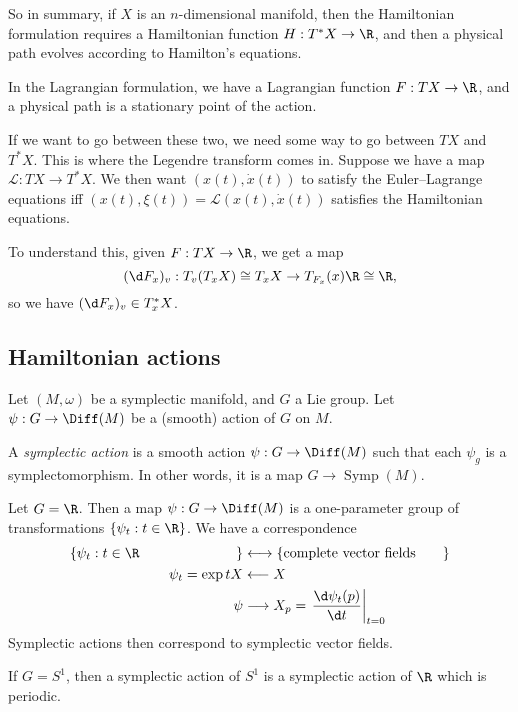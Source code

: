 \documentclass[a4paper]{article}
\DeclareMathOperator{\Symp}{Symp}
\begin{document}
So in summary, if $X$ is an $n$-dimensional manifold, then the Hamiltonian formulation requires a Hamiltonian function $H: T^* X \to \R$, and then a physical path evolves according to Hamilton's equations.

In the Lagrangian formulation, we have a Lagrangian function $F: TX \to \R$, and a physical path is a stationary point of the action.

If we want to go between these two, we need some way to go between $TX$ and $T^*X$. This is where the Legendre transform comes in. Suppose we have a map $\mathcal{L}: TX \to T^*X$. We then want $(x(t), \dot{x}(t))$ to satisfy the Euler--Lagrange equations iff $(x(t), \xi(t)) = \mathcal{L}(x(t), \dot{x}(t))$ satisfies the Hamiltonian equations.

To understand this, given $F: TX \to \R$, we get a map
\[
  (\d F_x)_v : T_v(T_x X) \cong T_x X \to T_{F_x}(x) \R \cong \R,
\]
so we have $(\d F_x)_v \in T_x^*X$.

\subsection{Hamiltonian actions}
Let $(M, \omega)$ be a symplectic manifold, and $G$ a Lie group. Let $\psi: G \to \Diff(M)$ be a (smooth) action of $G$ on $M$.
\begin{defi}
  A \emph{symplectic action} is a smooth action $\psi: G \to \Diff(M)$ such that each $\psi_g$ is a symplectomorphism. In other words, it is a map $G \to \Symp(M)$.
\end{defi}

\begin{eg}
  Let $G = \R$. Then a map $\psi: G \to \Diff(M)$ is a one-parameter group of transformations $\{\psi_t: t \in \R\}$. We have a correspondence
  \begin{align*}
    \left\{\parbox{4cm}{$\psi_t: t \in \R$}\right\} &\longleftrightarrow\left\{ \parbox{4cm}{complete vector fields} \right\}\\
    \psi_t = \exp tX & \longleftarrow X\\
    \psi &\longrightarrow X_p = \left.\frac{\d \psi_t (p)}{\d t}\right|_{t = 0}
  \end{align*}
  Symplectic actions then correspond to symplectic vector fields.
\end{eg}

\begin{eg}
  If $G = S^1$, then a symplectic action of $S^1$ is a symplectic action of $\R$ which is periodic.
\end{eg}
\end{document}
